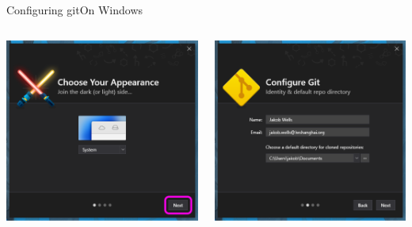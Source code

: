 \documentclass[aspectratio=169]{beamer}
\begin{document}
\begin{frame}{Configuring git}{On Windows}
    \begin{columns}
        \begin{column}{0.5\textwidth}
            \centering
            \includegraphics[width=\linewidth]{choose_your_appearance.png}
        \end{column}
        \begin{column}{0.5\textwidth}
            \centering
            \includegraphics[width=\linewidth]{configure_git.png}
        \end{column}
    \end{columns}
\end{frame}
\end{document}

